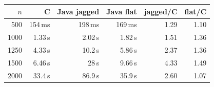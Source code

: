\begin{tabular}{rrrrrr}
\toprule
$n$ & C & Java jagged & Java flat & jagged/C & flat/C \\
\midrule
500 & 154\,ms & 198\,ms & 169\,ms & 1.29 & 1.10 \\
1000 & 1.33\,s & 2.02\,s & 1.82\,s & 1.51 & 1.36 \\
1250 & 4.33\,s & 10.2\,s & 5.86\,s & 2.37 & 1.36 \\
1500 & 6.46\,s & 28\,s & 9.66\,s & 4.33 & 1.49 \\
2000 & 33.4\,s & 86.9\,s & 35.9\,s & 2.60 & 1.07 \\
\bottomrule
\end{tabular}
